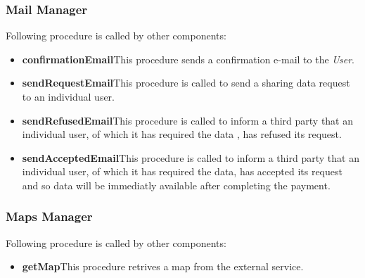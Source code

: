 \subsubsection{Mail Manager}
Following procedure is called by other components:
\begin{itemize}
  \item \textbf{confirmationEmail}\quad This procedure sends a confirmation e-mail to the \textit{User}.
  \item \textbf{sendRequestEmail}\quad This procedure is called to send a sharing data request to an individual user.
  \item \textbf{sendRefusedEmail}\quad This procedure is called to inform a third party that an individual user, of which it has required the data , has refused its request.
  \item \textbf{sendAcceptedEmail}\quad This procedure is called to inform a third party that an individual user, of which it has required the data, has accepted its request and so data will be immediatly available after completing the payment.
\end{itemize}

\subsubsection{Maps Manager}
Following procedure is called by other components:
\begin{itemize}
  \item \textbf{getMap}\quad This procedure retrives a map from the external service.
\end{itemize}

